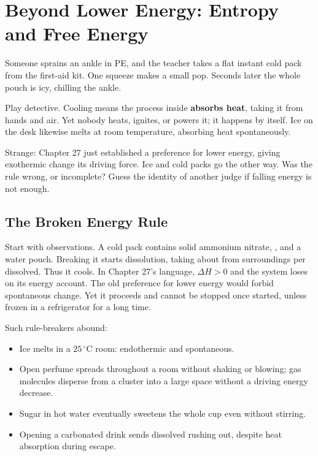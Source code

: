 \chapter{Beyond Lower Energy: Entropy and Free Energy}

\begin{kaichang}
Someone sprains an ankle in PE, and the teacher takes a flat instant cold pack from the first-aid kit. One squeeze makes a small pop. Seconds later the whole pouch is icy, chilling the ankle.

Play detective. Cooling means the process inside \textbf{absorbs heat}, taking it from hands and air. Yet nobody heats, ignites, or powers it; it happens by itself. Ice on the desk likewise melts at room temperature, absorbing heat spontaneously.

Strange: Chapter 27 just established a preference for lower energy, giving exothermic change its driving force. Ice and cold packs go the other way. Was the rule wrong, or incomplete? Guess the identity of another judge if falling energy is not enough.
\end{kaichang}

\section{The Broken Energy Rule}

Start with observations. A cold pack contains solid ammonium nitrate, , and a water pouch. Breaking it starts dissolution, taking about  from surroundings per  dissolved. Thus it cools. In Chapter 27's language, $\Delta H>0$ and the system loses on its energy account. The old preference for lower energy would forbid spontaneous change. Yet it proceeds and cannot be stopped once started, unless frozen in a refrigerator for a long time.

Such rule-breakers abound:

\begin{itemize}[itemsep=2pt]
\item Ice melts in a $25\,^{\circ}\mathrm{C}$ room: endothermic and spontaneous.
\item Open perfume spreads throughout a room without shaking or blowing; gas molecules disperse from a cluster into a large space without a driving energy decrease.
\item Sugar in hot water eventually sweetens the whole cup even without stirring.
\item Opening a carbonated drink sends dissolved  rushing out, despite heat absorption during escape.
\end{itemize}

